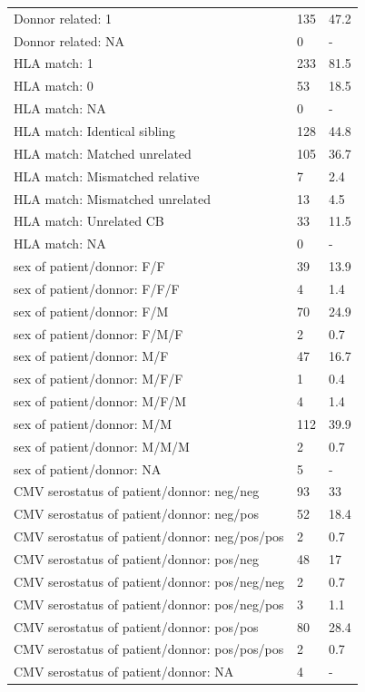 \documentclass[a4paper,11pt] {article}
\begin{document}
\begin{longtable}{lll}
  Donnor related: 1 & 135 & 47.2 \\ 
  Donnor related: NA & 0 & - \\ 
  HLA match: 1 & 233 & 81.5 \\ 
  HLA match: 0 & 53 & 18.5 \\ 
  HLA match: NA & 0 & - \\ 
  HLA match: Identical sibling & 128 & 44.8 \\ 
  HLA match: Matched unrelated & 105 & 36.7 \\ 
  HLA match: Mismatched relative & 7 & 2.4 \\ 
  HLA match: Mismatched unrelated & 13 & 4.5 \\ 
  HLA match: Unrelated CB & 33 & 11.5 \\ 
  HLA match: NA & 0 & - \\ 
  sex of patient/donnor: F/F & 39 & 13.9 \\ 
  sex of patient/donnor: F/F/F & 4 & 1.4 \\ 
  sex of patient/donnor: F/M & 70 & 24.9 \\ 
  sex of patient/donnor: F/M/F & 2 & 0.7 \\ 
  sex of patient/donnor: M/F & 47 & 16.7 \\ 
  sex of patient/donnor: M/F/F & 1 & 0.4 \\ 
  sex of patient/donnor: M/F/M & 4 & 1.4 \\ 
  sex of patient/donnor: M/M & 112 & 39.9 \\ 
  sex of patient/donnor: M/M/M & 2 & 0.7 \\ 
  sex of patient/donnor: NA & 5 & - \\ 
  CMV serostatus of patient/donnor: neg/neg & 93 & 33 \\ 
  CMV serostatus of patient/donnor: neg/pos & 52 & 18.4 \\ 
  CMV serostatus of patient/donnor: neg/pos/pos & 2 & 0.7 \\ 
  CMV serostatus of patient/donnor: pos/neg & 48 & 17 \\ 
  CMV serostatus of patient/donnor: pos/neg/neg & 2 & 0.7 \\ 
  CMV serostatus of patient/donnor: pos/neg/pos & 3 & 1.1 \\ 
  CMV serostatus of patient/donnor: pos/pos & 80 & 28.4 \\ 
  CMV serostatus of patient/donnor: pos/pos/pos & 2 & 0.7 \\ 
  CMV serostatus of patient/donnor: NA & 4 & - \\ 

\end{longtable}
\end{document}
